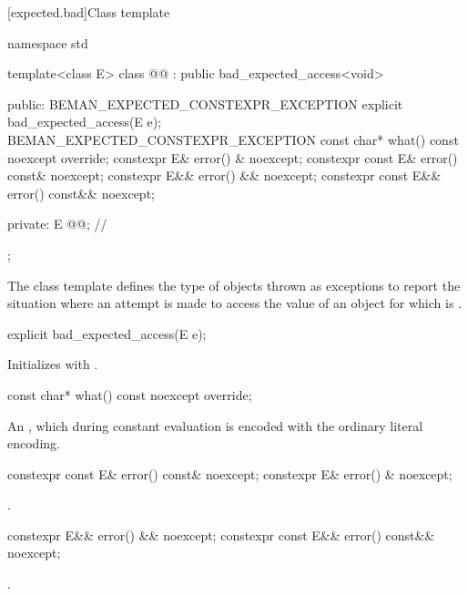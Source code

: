 [expected.bad]{Class template }

\begin{codeblock}
namespace std {
  template<class E>
  class @@ : public bad_expected_access<void> {
  public:
    BEMAN_EXPECTED_CONSTEXPR_EXCEPTION explicit bad_expected_access(E e);
    BEMAN_EXPECTED_CONSTEXPR_EXCEPTION const char* what() const noexcept override;
    constexpr E& error() & noexcept;
    constexpr const E& error() const& noexcept;
    constexpr E&& error() && noexcept;
    constexpr const E&& error() const&& noexcept;

  private:
    E @@; // \expos
  };
}
\end{codeblock}

\pnum
The class template  defines the type of objects thrown as exceptions to report the situation where an attempt is made to access the value of an  object for which  is .

%
\begin{itemdecl}
explicit bad_expected_access(E e);
\end{itemdecl}

\begin{itemdescr}
\pnum
\effects
Initializes  with .
\end{itemdescr}

%
\begin{itemdecl}
const char* what() const noexcept override;
\end{itemdecl}

\begin{itemdescr}
\pnum
\returns
An  \ntbs{}, which during constant evaluation is encoded with the ordinary literal encoding.
\end{itemdescr}

%
\begin{itemdecl}
constexpr const E& error() const& noexcept;
constexpr E& error() & noexcept;
\end{itemdecl}

\begin{itemdescr}
\pnum
\returns
{}.
\end{itemdescr}

%
\begin{itemdecl}
constexpr E&& error() && noexcept;
constexpr const E&& error() const&& noexcept;
\end{itemdecl}

\begin{itemdescr}
\pnum
\returns
{}.
\end{itemdescr}
